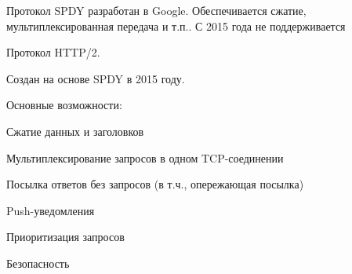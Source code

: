 
Протокол SPDY разработан в Google. Обеспечивается сжатие, мультиплексированная передача и т.п.. С 2015 года не поддерживается

Протокол HTTP/2.

Создан на основе SPDY в 2015 году.

Основные возможности:
\begin{MyItemize}
    \item Сжатие данных и заголовков
    \item Мультиплексирование запросов в одном TCP-соединении
    \item Посылка ответов без запросов (в т.ч., опережающая посылка)
    \item Push-уведомления
    \item Приоритизация запросов
    \item Безопасность
\end{MyItemize}

